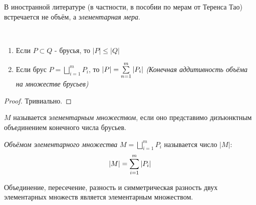 \begin{anote}
	В иностранной литературе (в частности, в пособии по мерам от Теренса Тао) встречается не объём, а \textit{элементарная мера}.
\end{anote}

\begin{proposition}~
	\begin{enumerate}
		\item Если $P \subset Q$ - брусья, то $|P| \le |Q|$
		
		\item Если брус $P = \bigsqcup\limits_{i = 1}^m P_i$, то $|P| = \sum\limits_{n = 1}^m |P_i|$ \textit{(Конечная аддитивность объёма на множестве брусьев)}
	\end{enumerate}
\end{proposition}

\begin{proof}
	Тривиально.
\end{proof}

\begin{definition}
	$M$ называется \textit{элементарным множеством}, если оно представимо дизъюнктным объединением конечного числа брусьев.
\end{definition}

\begin{definition}
	\textit{Объёмом элементарного множества} $M = \bigsqcup\limits_{i = 1}^m P_i$ называется число $|M|$:
	\[
		|M| = \sum\limits_{i = 1}^m |P_i|
	\]
\end{definition}

\begin{lemma}
	Объединение, пересечение, разность и симметрическая разность двух элементарных множеств является элементарным множеством.
\end{lemma}

\begin{center}
\end{center}

